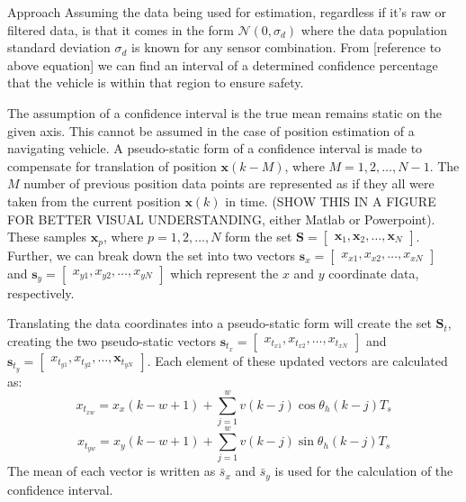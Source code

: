 \begin{section}{Approach}
Assuming the data being used for estimation, regardless if it's raw or filtered data, is that it comes in the form $\mathcal{N}(0,\sigma_d)$ where the data population standard deviation $\sigma_d$ is known for any sensor combination. From [reference to above equation] we can find an interval of a determined confidence percentage that the vehicle is within that region to ensure safety. 

The assumption of a confidence interval is the true mean remains static on the given axis. This cannot be assumed in the case of position estimation of a navigating vehicle. A pseudo-static form of a confidence interval is made to compensate for translation of position $\bm{x}(k-M)$, where $M=1,2,\dots,N-1$. The $M$ number of previous position data points are represented as if they all were taken from the current position $\bm{x}(k)$ in time. (SHOW THIS IN A FIGURE FOR BETTER VISUAL UNDERSTANDING, either Matlab or Powerpoint). These samples $\bm{x}_p$, where $p=1,2,\dots,N$ form the set $\mathcal{\bm{S}}=\begin{bmatrix}\bm{x}_1,\bm{x}_2,\dots,\bm{x}_N \end{bmatrix}$. Further, we can break down the set into two vectors $\bm{s}_x=\begin{bmatrix} x_{x1},x_{x2},\dots,x_{xN} \end{bmatrix}$ and $\bm{s}_y=\begin{bmatrix} x_{y1},x_{y2},\dots,x_{yN} \end{bmatrix}$ which represent the $x$ and $y$ coordinate data, respectively. 

Translating the data coordinates into a pseudo-static form will create the set $\mathcal{\bm{S}}_t$, creating the two pseudo-static vectors $\bm{s}_{t_x}=\begin{bmatrix} x_{t_{x1}},x_{t_{x2}},\dots,x_{t_{xN}} \end{bmatrix}$ and $\bm{s}_{t_y}=\begin{bmatrix} x_{t_{y1}},x_{t_{y2}},\dots,\bm{x}_{t_{yN}} \end{bmatrix}$. Each element of these updated vectors are calculated as:
    \begin{equation}
	x_{t_{xw}} = x_x(k-w+1)+\sum_{j=1}^w v(k-j)\cos{\theta_h(k-j)T_s}
	\end{equation}
	\begin{equation}
	x_{t_{yw}} = x_y(k-w+1)+\sum_{j=1}^w v(k-j)\sin{\theta_h(k-j)T_s}
	\end{equation}
The mean of each vector is written as $\bar{s}_x$ and $\bar{s}_y$ is used for the calculation of the confidence interval.


\end{section}
